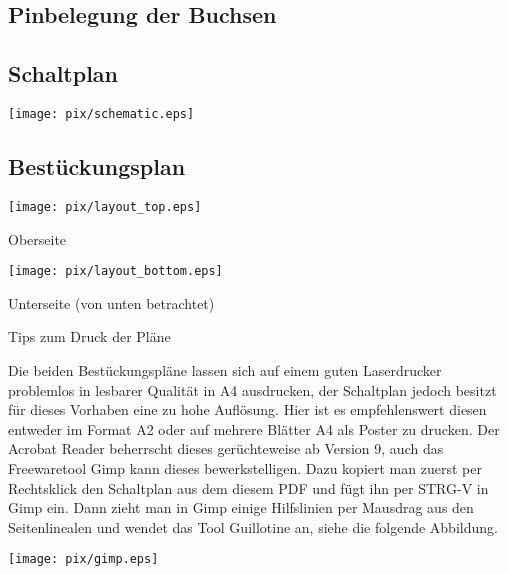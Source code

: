 \documentclass[a4paper]{article}
\begin{document}
\subsection{Pinbelegung der Buchsen}

\newpage

\subsection{Schaltplan}

\begin{center}

\texttt{[image: pix/schematic.eps]}

\end{center}

\subsection{Bestückungsplan}

\begin{center}

\texttt{[image: pix/layout\_top.eps]}

Oberseite

\end{center}

\newpage

\begin{center}

\texttt{[image: pix/layout\_bottom.eps]}

Unterseite (von unten betrachtet)

\end{center}

\newpage

Tips zum Druck der Pläne

Die beiden Bestückungspläne lassen sich auf einem guten Laserdrucker problemlos in lesbarer Qualität in A4 ausdrucken, der Schaltplan jedoch besitzt für dieses Vorhaben eine zu hohe Auflösung. Hier ist es empfehlenswert diesen entweder im Format A2 oder auf mehrere Blätter A4 als Poster zu drucken. Der Acrobat Reader beherrscht dieses gerüchteweise ab Version 9, auch das Freewaretool Gimp kann dieses bewerkstelligen. Dazu kopiert man zuerst per Rechtsklick den Schaltplan aus dem diesem PDF und fügt ihn per STRG-V in Gimp ein. Dann zieht man in Gimp einige Hilfslinien per Mausdrag aus den Seitenlinealen und wendet das Tool Guillotine an, siehe die folgende Abbildung. 

\texttt{[image: pix/gimp.eps]}
\end{document}
